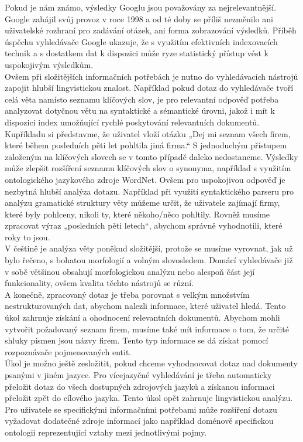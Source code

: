 \begin{multicols}{2}
Pokud je nám známo, výsledky Googlu jsou považovány za nejrelevantnější. Google zahájil svůj provoz v roce 1998 a od té doby se příliš nezměnilo ani uživatelské rozhraní pro zadávání otázek, ani forma zobrazování výsledků. Příběh úspěchu vyhledávače Google ukazuje, že s využitím efektivních indexovacích technik a s dostatkem dat k dispozici může ryze statistický přístup vést k uspokojivým výsledkům.\\
Ovšem při složitějších informačních potřebách je nutno do vyhledávacích nástrojů zapojit hlubší lingvistickou znalost. Například pokud dotaz do vyhledávače tvoří celá věta namísto seznamu klíčových slov, je pro relevantní odpověď potřeba analyzovat dotyčnou větu na syntaktické a sémantické úrovni, jakož i mít k dispozici index umožňující rychlé poskytování relevantních dokumentů.
Kupříkladu si představme, že uživatel vloží otázku „Dej mi seznam všech firem, které během posledních pěti let pohltila jiná firma.“ S jednoduchým přístupem založeným na klíčových slovech se v tomto případě daleko nedostaneme. Výsledky může zlepšit rozšíření seznamu klíčových slov o synonyma, například s využitím ontologického jazykového zdroje WordNet. Ovšem pro uspokojivou odpověď je nezbytná hlubší analýza dotazu. Například při využití syntaktického parseru pro analýzu gramatické struktury věty můžeme určit, že uživatele zajímají firmy, které byly pohlceny, nikoli ty, které někoho/něco pohltily. Rovněž musíme zpracovat výraz „posledních pěti letech“, abychom správně vyhodnotili, které roky to jsou.\\
V češtině je analýza věty poněkud složitější, protože se musíme vyrovnat, jak už bylo řečeno, s bohatou morfologií a volným slovosledem. Domácí vyhledávače již v sobě většinou obsahují morfologickou analýzu nebo alespoň část její funkcionality, ovšem kvalita těchto nástrojů se různí.\\
A konečně, zpracovaný dotaz je třeba porovnat s velkým množstvím nestrukturovaných dat, abychom nalezli informace, které uživatel hledá. Tento úkol zahrnuje získání a ohodnocení relevantních dokumentů. Abychom mohli vytvořit požadovaný seznam firem, musíme také mít informace o tom, že určité shluky písmen jsou názvy firem. Tento typ informace se dá získat pomocí rozpoznávače pojmenovaných entit.\\
Úkol je možno ještě zesložitit, pokud chceme vyhodnocovat dotaz nad dokumenty psanými v jiném jazyce. Pro vícejazyčné vyhledávání je třeba automaticky přeložit dotaz do všech dostupných zdrojových jazyků a získanou informaci přeložit zpět do cílového jazyka. Tento úkol opět zahrnuje lingvistickou analýzu. Pro uživatele se specifickými informačními potřebami může rozšíření dotazu vyžadovat dodatečné zdroje informací jako například doménově specifickou ontologii reprezentující vztahy mezi jednotlivými pojmy.


\end{multicols}
